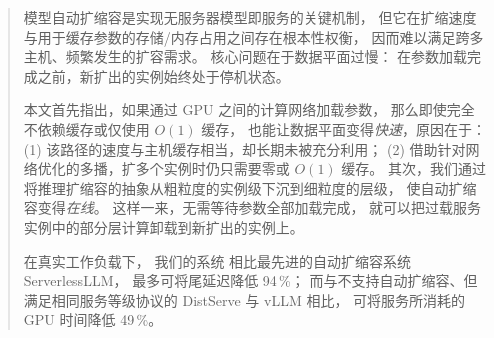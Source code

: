 \begin{abstract}
\noindent
模型自动扩缩容是实现无服务器模型即服务的关键机制，
但它在扩缩速度与用于缓存参数的存储/内存占用之间存在根本性权衡，
因而难以满足跨多主机、频繁发生的扩容需求。
核心问题在于数据平面过慢：
在参数加载完成之前，新扩出的实例始终处于停机状态。

本文首先指出，如果通过 GPU 之间的计算网络加载参数，
那么即使完全不依赖缓存或仅使用 $O(1)$ 缓存，
也能让数据平面变得\emph{快速}，原因在于：
(1) 该路径的速度与主机缓存相当，却长期未被充分利用；
(2) 借助针对网络优化的多播，扩多个实例时仍只需要零或 $O(1)$ 缓存。
其次，我们通过将推理扩缩容的抽象从粗粒度的实例级下沉到细粒度的层级，
使自动扩缩容变得\emph{在线}。
这样一来，无需等待参数全部加载完成，
就可以把过载服务实例中的部分层计算卸载到新扩出的实例上。

在真实工作负载下，
我们的系统 {\sys} 相比最先进的自动扩缩容系统 ServerlessLLM，
最多可将尾延迟降低 94\,\%；
而与不支持自动扩缩容、但满足相同服务等级协议的 DistServe 与 vLLM 相比，
{\sys} 可将服务所消耗的 GPU 时间降低 49\,\%。
\end{abstract}
